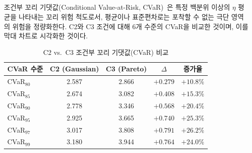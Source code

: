 \subsection{}
\label{subsec:cvar}

조건부 꼬리 기댓값(Conditional Value-at-Risk, CVaR)~\citep{rockafellar2000optimization}은 특정 백분위 이상의
$\eta$ 평균을 나타내는 꼬리 위험 척도로서, 평균이나 표준편차로는
포착할 수 없는 극단 영역의 위험을 정량화한다.
 C2와 C3 조건에 대해 6개 수준의 CVaR을 비교한 것이며,
 이를 막대 차트로 시각화한 것이다.

\begin{table}[htbp]
  \centering
  \caption{C2 vs.\ C3 조건부 꼬리 기댓값(CVaR) 비교}
  \label{tab:cvar_comparison}
  \begin{tabular}{lcccc}
    \toprule
    CVaR 수준 & C2 (Gaussian) & C3 (Pareto) & $\Delta$ & 증가율 \\
    \midrule
    CVaR$_{80}$ & 2.587 & 2.866 & $+0.279$ & $+10.8\%$ \\
    CVaR$_{85}$ & 2.674 & 3.082 & $+0.408$ & $+15.3\%$ \\
    CVaR$_{90}$ & 2.778 & 3.346 & $+0.568$ & $+20.4\%$ \\
    CVaR$_{95}$ & 2.925 & 3.665 & $+0.740$ & $+25.3\%$ \\
    CVaR$_{97}$ & 3.017 & 3.808 & $+0.791$ & $+26.2\%$ \\
    CVaR$_{99}$ & 3.180 & 3.944 & $+0.764$ & $+24.0\%$ \\
    \bottomrule
  \end{tabular}
\end{table}

